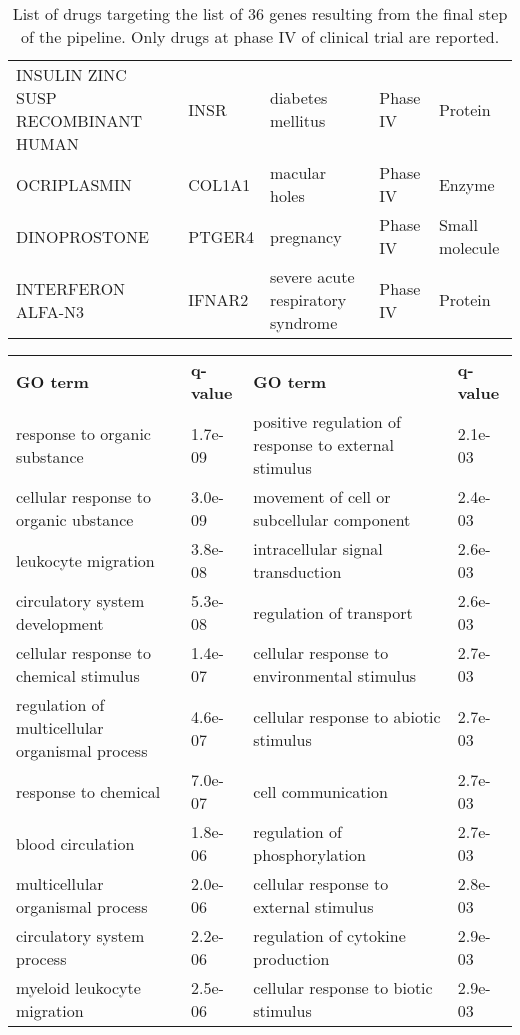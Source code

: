 \documentclass[fleqn,10pt]{SelfArx} %
\begin{document}
\begin{table}[ht]
\begin{tabularx}{\textwidth}{lXlll}
		INSULIN ZINC SUSP RECOMBINANT HUMAN & INSR & diabetes mellitus & Phase IV & Protein \\ 
		OCRIPLASMIN & COL1A1 & macular holes & Phase IV & Enzyme \\ 
		DINOPROSTONE & PTGER4 & pregnancy & Phase IV & Small molecule \\ 
		INTERFERON ALFA-N3 & IFNAR2 & severe acute respiratory syndrome & Phase IV & Protein \\ 
	\end{tabularx}
	\smallskip
	\caption{List of drugs targeting the list of 36 genes resulting from the final step of the pipeline. Only drugs at phase IV of clinical trial are reported.}
	\label{tab:drugs}
\end{table}


\begin{table}[ht]
	\centering
	\scriptsize
	\begin{tabularx}{\textwidth}{XlXl}
		\rowcolor{NavyBlue!80}
		\textbf{\color{white} GO term} & \textbf{\color{white} q-value} & \textbf{\color{white} GO term} & \textbf{\color{white} q-value} \\
		response to organic substance & 1.7e-09 & positive regulation of response to external stimulus & 2.1e-03 \\ 
		cellular response to organic ubstance & 3.0e-09 & movement of cell or subcellular component & 2.4e-03 \\ 
		leukocyte migration & 3.8e-08 & intracellular signal transduction & 2.6e-03 \\ 
		circulatory system development & 5.3e-08 & regulation of transport & 2.6e-03 \\ 
		cellular response to chemical stimulus & 1.4e-07 & cellular response to environmental stimulus & 2.7e-03 \\ 
		regulation of multicellular organismal process & 4.6e-07 & cellular response to abiotic stimulus & 2.7e-03 \\ 
		response to chemical & 7.0e-07 & cell communication & 2.7e-03 \\ 
		blood circulation & 1.8e-06 & regulation of phosphorylation & 2.7e-03 \\ 
		multicellular organismal process & 2.0e-06 & cellular response to external stimulus & 2.8e-03 \\ 
		circulatory system process & 2.2e-06 & regulation of cytokine production & 2.9e-03 \\ 
		myeloid leukocyte migration & 2.5e-06 & cellular response to biotic stimulus & 2.9e-03 \\ 

\end{tabularx}
\end{table}
\end{document}

